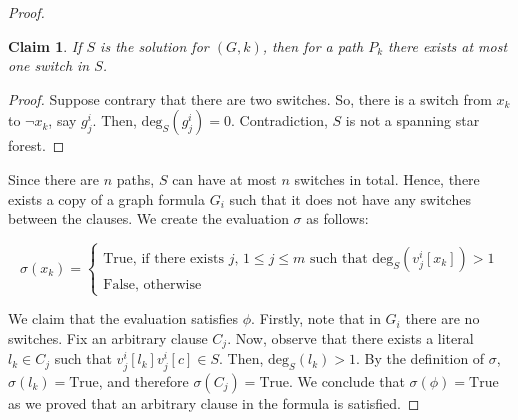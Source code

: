 \documentclass[en]{pracamgr}
\newtheorem{claim}{Claim}
\theoremstyle{definition}
\newcommand{\degree}[2]{\textrm{deg}_{#1}(#2)}
\newcommand{\true}{\textrm{True}}
\begin{document}
\begin{proof}
	\begin{claim}
		If $S$ is the solution for $(G,k)$, then for a path $P_k$ there exists at most one switch in $S$.
	\end{claim}

	\begin{proof}
		Suppose contrary that there are two switches. So, there is a switch from $x_k$ to $\neg x_k$, say $g^i_j$. Then, $\degree{S}{g^i_j}=0$. Contradiction, $S$ is not a spanning star forest.
	\end{proof}

	Since there are $n$ paths, $S$ can have at most $n$ switches in total. Hence, there exists a copy of a graph formula $G_i$ such that it does not have any switches between the clauses. We create the evaluation $\sigma$ as follows:
	
	\begin{equation*}
	\sigma(x_k) = 
	\begin{cases}
	\textrm{True}\text{, if there exists $j$, $1 \leq j \leq m$ such that $\degree{S}{v^i_j[x_k]} > 1$} \\
	\textrm{False}\text{, otherwise}
	\end{cases}
	\end{equation*}
	
	\noindent
	We claim that the evaluation satisfies $\phi$. Firstly, note that in $G_i$ there are no switches. Fix an arbitrary clause $C_j$. Now, observe that there exists a literal $l_k \in C_j$ such that $v^i_j[l_k]v^i_j[c] \in S$. Then, $\degree{S}{l_k}>1$. By the definition of $\sigma$, $\sigma(l_k)=\true$, and therefore $\sigma(C_j)=\true$. We conclude that $\sigma(\phi)=\true$ as we proved that an arbitrary clause in the formula is satisfied.\qedhere
\end{proof}

 

\end{document}
